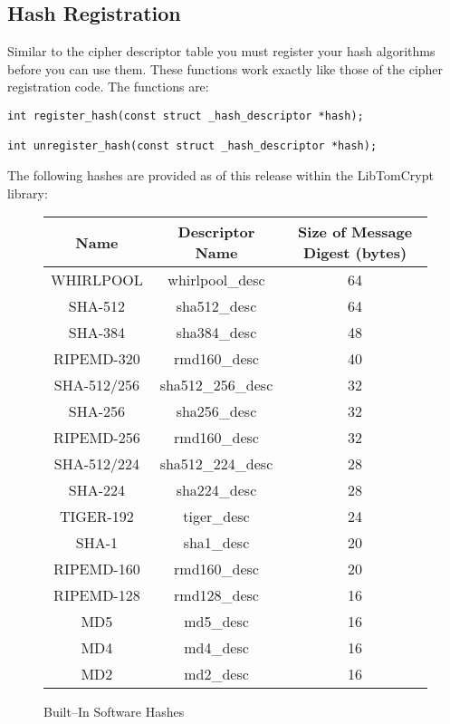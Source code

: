 \documentclass[synpaper]{book}
\begin{document}
\subsection{Hash Registration}
Similar to the cipher descriptor table you must register your hash algorithms before you can use them.  These functions
work exactly like those of the cipher registration code.  The functions are:
 
\begin{verbatim}
int register_hash(const struct _hash_descriptor *hash);

int unregister_hash(const struct _hash_descriptor *hash);
\end{verbatim}

The following hashes are provided as of this release within the LibTomCrypt library:

\begin{figure}[here]
\begin{center}
\begin{tabular}{|c|c|c|}
      \hline \textbf{Name} & \textbf{Descriptor Name} & \textbf{Size of Message Digest (bytes)} \\
      \hline WHIRLPOOL & whirlpool\_desc & 64 \\
      \hline SHA-512 & sha512\_desc & 64 \\
      \hline SHA-384 & sha384\_desc & 48 \\
      \hline RIPEMD-320 & rmd160\_desc & 40 \\
      \hline SHA-512/256 & sha512\_256\_desc & 32 \\
      \hline SHA-256 & sha256\_desc & 32 \\
      \hline RIPEMD-256 & rmd160\_desc & 32 \\
      \hline SHA-512/224 & sha512\_224\_desc & 28 \\
      \hline SHA-224 & sha224\_desc & 28 \\
      \hline TIGER-192 & tiger\_desc & 24 \\
      \hline SHA-1 & sha1\_desc & 20 \\
      \hline RIPEMD-160 & rmd160\_desc & 20 \\
      \hline RIPEMD-128 & rmd128\_desc & 16 \\
      \hline MD5 & md5\_desc & 16 \\
      \hline MD4 & md4\_desc & 16 \\
      \hline MD2 & md2\_desc & 16 \\
      \hline
\end{tabular}
\end{center}
\caption{Built--In Software Hashes}
\end{figure}
\vfil
\end{document}
